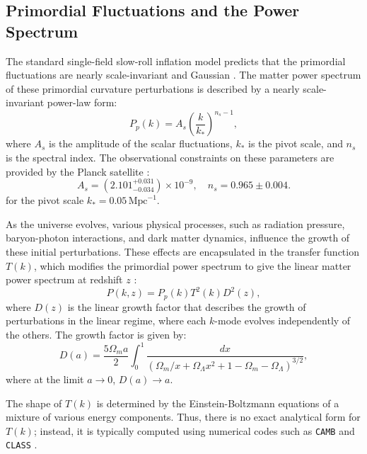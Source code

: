 \subsection{Primordial Fluctuations and the Power Spectrum}
The standard single-field slow-roll inflation model predicts that the primordial fluctuations are nearly scale-invariant and Gaussian \citep{2003moco.book.....D}. The matter power spectrum of these primordial curvature perturbations is described by a nearly scale-invariant power-law form:
\begin{equation}
    P_p(k) = A_s \left(\frac{k}{k_*}\right)^{n_s - 1},
\end{equation}
where $A_s$ is the amplitude of the scalar fluctuations, $k_*$ is the pivot scale, and $n_s$ is the spectral index. The observational constraints on these parameters are provided by the Planck satellite \citep{2020A&A...641A...6P}:
\begin{equation}
    A_s = (2.101^{+0.031}_{-0.034}) \times 10^{-9}, \quad n_s = 0.965 \pm 0.004.
\end{equation}
for the pivot scale \( k_* = 0.05 \, \text{Mpc}^{-1} \).

As the universe evolves, various physical processes, such as radiation pressure, baryon-photon interactions, and dark matter dynamics, influence the growth of these initial perturbations. These effects are encapsulated in the transfer function $T(k)$, which modifies the primordial power spectrum to give the linear matter power spectrum at redshift $z$ \citep{2003moco.book.....D}:
\begin{equation}
    P(k, z) = P_p(k) T^2(k) D^2(z),
\end{equation}
where $D(z)$ is the linear growth factor that describes the growth of perturbations in the linear regime, where each $k$-mode evolves independently of the others. The growth factor is given by:
\begin{equation}
    D(a) = \frac{5 \Omega_m a}{2} \int_0^1 \frac{dx}{(\Omega_m / x + \Omega_\Lambda x^2 + 1 - \Omega_m - \Omega_\Lambda)^{3/2}},
\end{equation}
where at the limit $a \to 0$, $D(a) \to a$. 

The shape of $T(k)$ is determined by the Einstein-Boltzmann equations of a mixture of various energy components. Thus, there is no exact analytical form for $T(k)$; instead, it is typically computed using numerical codes such as \texttt{CAMB} \citep{2000ApJ...538..473L} and \texttt{CLASS} \citep{2011JCAP...07..034B}.

